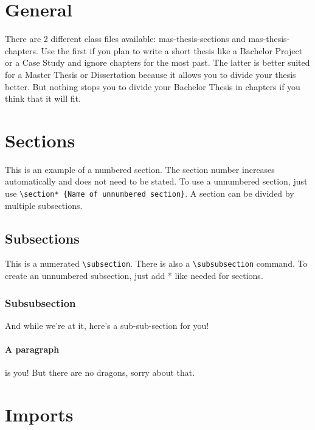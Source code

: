 \documentclass[seminarpaper, grey, english]{mas-thesis-sections}   %
\begin{document}
\section{General}

There are 2 different class files available: mas-thesis-sections and mas-thesis-chapters. Use the first if you plan to write a short thesis like a Bachelor Project or a Case Study and ignore chapters for the most past. The latter is better suited for a Master Thesis or Dissertation because it allows you to divide your thesis better. But nothing stops you to divide your Bachelor Thesis in chapters if you think that it will fit.



\section{Sections}

This is an example of a numbered section. The section number increases automatically and does not need to be stated. To use a unnumbered section, just use \texttt{\textbackslash section* \{Name of unnumbered section\}}. A section can be divided by multiple subsections.

\subsection{Subsections}

This is a numerated \texttt{\textbackslash subsection}. There is also a \texttt{\textbackslash subsubsection} command. To create an unnumbered subsection, just add * like needed for sections.

\subsubsection{Subsubsection}

And while we're at it, here's a sub-sub-section for you!

\paragraph{A paragraph} is you! But there are no dragons, sorry about that.



\section{Imports}
\end{document}
